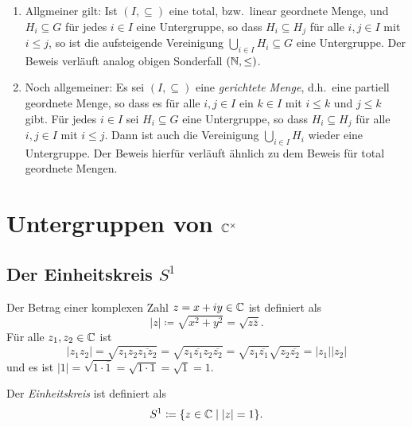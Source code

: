 \begin{bem}\label{bem: increasing union of subgroups}
 \begin{enumerate}[leftmargin=*]
  \item
   Allgmeiner gilt: Ist $(I, \subseteq)$ eine total, bzw.\ linear geordnete Menge, und $H_i \subseteq G$ für jedes $i \in I$ eine Untergruppe, so dass $H_i \subseteq H_j$ für alle $i,j \in I$ mit $i \leq j$, so ist die aufsteigende Vereinigung $\bigcup_{i \in I} H_i \subseteq G$ eine Untergruppe. Der Beweis verläuft analog obigen Sonderfall $(\mathbb{N}, \leq)$.
  \item
   Noch allgemeiner: Es sei $(I, \subseteq)$ eine \emph{gerichtete Menge}, d.h.\ eine partiell geordnete Menge, so dass es für alle $i,j \in I$ ein $k \in I$ mit $i \leq k$ und $j \leq k$ gibt. Für jedes $i \in I$ sei $H_i \subseteq G$ eine Untergruppe, so dass $H_i \subseteq H_j$ für alle $i,j \in I$ mit $i \leq j$. Dann ist auch die Vereinigung $\bigcup_{i \in I} H_i$ wieder eine Untergruppe. Der Beweis hierfür verläuft ähnlich zu dem Beweis für total geordnete Mengen.
 \end{enumerate}
\end{bem}





\section{Untergruppen von \texorpdfstring{$\mathbb{C}^\times$}{Cx}}



\subsection{Der Einheitskreis \texorpdfstring{$S^1$}{S1}}
Der Betrag einer komplexen Zahl $z = x+iy \in \mathbb{C}$ ist definiert als
\[
 |z| \coloneqq \sqrt{x^2+y^2} = \sqrt{z \overline{z}}.
\]
Für alle $z_1, z_2 \in \mathbb{C}$ ist
\[
 |z_1 z_2|
 = \sqrt{z_1 z_2 \overline{z_1 z_2}}
 = \sqrt{z_1 \overline{z_1} z_2 \overline{z_2}}
 = \sqrt{z_1 \overline{z_1}} \sqrt{z_2 \overline{z_2}}
 = |z_1| |z_2|
\]
und es ist $|1| = \sqrt{1 \cdot \overline{1}} = \sqrt{1 \cdot 1} = \sqrt{1} = 1$.

\begin{defi}
 Der \emph{Einheitskreis} ist definiert als
\[
 S^1 \coloneqq \{z \in \mathbb{C} \mid |z| = 1\}.
\]
\end{defi}


